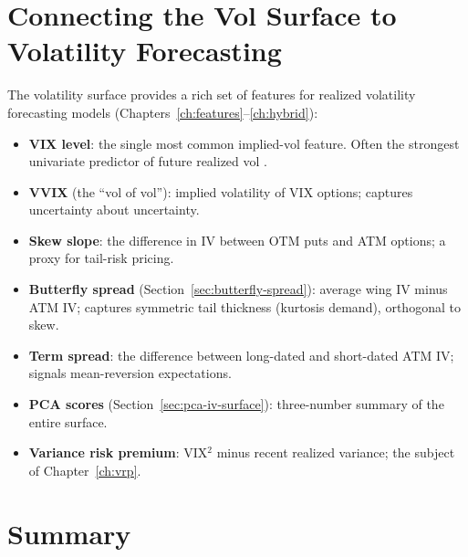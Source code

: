 \section{Connecting the Vol Surface to Volatility Forecasting}
\label{sec:surface-to-forecasting}

\begin{keyidea}
The volatility surface provides a rich set of features for realized volatility forecasting models (Chapters~\ref{ch:features}--\ref{ch:hybrid}):
\begin{itemize}[nosep]
  \item \textbf{VIX level}: the single most common implied-vol feature. Often the strongest univariate predictor of future realized vol \citep{Gu2020}.
  \item \textbf{VVIX} (the ``vol of vol''): implied volatility of VIX options; captures uncertainty about uncertainty.
  \item \textbf{Skew slope}: the difference in IV between OTM puts and ATM options; a proxy for tail-risk pricing.
  \item \textbf{Butterfly spread} (Section~\ref{sec:butterfly-spread}): average wing IV minus ATM IV; captures symmetric tail thickness (kurtosis demand), orthogonal to skew.
  \item \textbf{Term spread}: the difference between long-dated and short-dated ATM IV; signals mean-reversion expectations.
  \item \textbf{PCA scores} (Section~\ref{sec:pca-iv-surface}): three-number summary of the entire surface.
  \item \textbf{Variance risk premium}: VIX$^2$ minus recent realized variance; the subject of Chapter~\ref{ch:vrp}.
\end{itemize}
\end{keyidea}


\section{Summary}
\label{sec:volsurface-summary}

